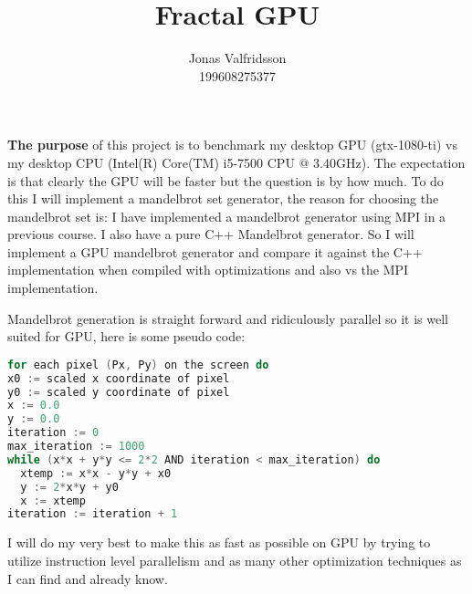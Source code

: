 \documentclass{article}
\title{Fractal GPU}
\date{}
\author{Jonas Valfridsson\\199608275377}
\begin{document}
\maketitle

\textbf{The purpose} of this project is to benchmark my desktop GPU (gtx-1080-ti) vs my desktop CPU (Intel(R) Core(TM) i5-7500 CPU @ 3.40GHz). The expectation is that clearly the GPU will be
faster but the question is by how much. To do this I will implement a mandelbrot set generator, the reason for choosing the mandelbrot set is: I have implemented a mandelbrot generator
using MPI in a previous course. I also have a pure C++ Mandelbrot generator. So I will implement a GPU mandelbrot generator and compare it against the C++ implementation when compiled
with optimizations and also vs the MPI implementation.


Mandelbrot generation is straight forward and ridiculously parallel so it is well suited for GPU, here is some pseudo code:



\begin{mdframed}[backgroundcolor=codeColor,leftmargin=0.0cm,hidealllines=true,%
  innerleftmargin=0.1cm,innerrightmargin=0.1cm,innertopmargin=0.5cm,innerbottommargin=0.10cm,
  roundcorner=15pt]
\begin{lstlisting}[language=c]
for each pixel (Px, Py) on the screen do
x0 := scaled x coordinate of pixel
y0 := scaled y coordinate of pixel 
x := 0.0
y := 0.0
iteration := 0
max_iteration := 1000
while (x*x + y*y <= 2*2 AND iteration < max_iteration) do
  xtemp := x*x - y*y + x0
  y := 2*x*y + y0
  x := xtemp
iteration := iteration + 1
\end{lstlisting}
\end{mdframed}

I will do my very best to make this as fast as possible on GPU by trying to utilize
instruction level parallelism and as many other optimization techniques as I can find and
already know. 
\end{document}
